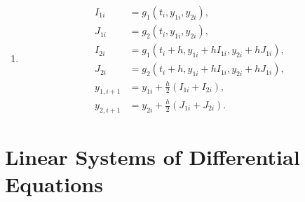 \documentclass[openany]{book}
\newenvironment{sectionSolutions}{
 \begin{enumerate}[item-label={\thesection.\arabic{enumi}.}]
}{
 \end{enumerate}
}
\begin{document}
\begin{sectionSolutions}
\addtocounter{enumi}{2}
\item%
\begin{align*}
I_{1i}&=g_1(t_i,y_{1i},y_{2i}),\\
J_{1i}&=g_2(t_i,y_{1i},y_{2i}),\\
I_{2i}&=g_1\left(t_i+h,y_{1i}+hI_{1i},y_{2i}+hJ_{1i}\right),\\
J_{2i}&=g_2\left(t_i+h,y_{1i}+hI_{1i},y_{2i}+hJ_{1i}\right),\\
y_{1,i+1}&=y_{1i}+\frac{h}{2}(I_{1i}+I_{2i}),\\
y_{2,i+1}&=y_{2i}+\frac{h}{2}(J_{1i}+J_{2i}).
\end{align*}

\end{sectionSolutions}

\section{Linear Systems of Differential  Equations}
\end{document}
